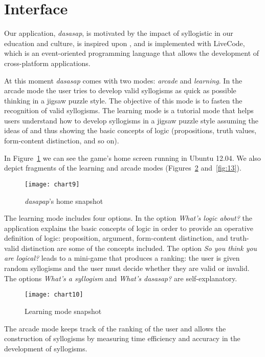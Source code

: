 \documentclass[a4paper,UKenglish]{lipics}
\begin{document}
\pagebreak

\section{Interface}
\label{sec:2}
Our application, \textit{dasasap}, is motivated by the impact of syllogistic in our education and culture, is inspired upon , and is implemented with LiveCode, which is an event-oriented programming language that allows the development of cross-platform applications.  

At this moment \textit{dasasap} comes with two modes: \textit{arcade} and \textit{learning}. In the arcade mode the user tries to develop valid syllogisms as quick as possible thinking in a jigsaw puzzle style. The objective of this mode is to fasten the recognition of valid syllogisms. The learning mode is a tutorial mode that helps users understand how to develop syllogisms in a jigsaw puzzle style assuming the ideas of  and thus showing the basic concepts of logic (propositions, truth values, form-content distinction, and so on). 

In Figure~\ref{fig:11} we can see the game's home screen running in Ubuntu 12.04. We also depict fragments of the learning and arcade modes (Figures~\ref{fig:12} and~\ref{fig:13}).  
 
\begin{figure}[h]
  \texttt{[image: chart9]}
  \caption{\textit{dasapap}'s home snapshot}  
  \label{fig:11}
\end{figure}

The learning mode includes four options. In the option \textit{What's logic about?} the application explains the basic concepts of logic in order to provide an operative definition of logic: proposition, argument, form-content distinction, and  truth-valid distinction are some of the concepts included. The option \textit{So you think you are logical?} leads to a mini-game that produces a ranking: the user is given random syllogisms and the user must decide whether they are valid or invalid. The options \textit{What's a syllogism} and \textit{What's dasasap?} are self-explanatory. 

\begin{figure}[h]
  \texttt{[image: chart10]}
  \caption{Learning mode snapshot}  
  \label{fig:12}
\end{figure}

The arcade mode keeps track of the ranking of the user and allows the construction of syllogisms by measuring time efficiency and accuracy in the development of syllogisms.
\end{document}

